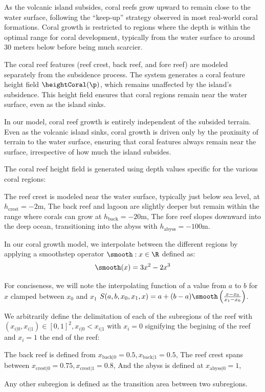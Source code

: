 As the volcanic island subsides, coral reefs grow upward to remain close to the water surface, following the “keep-up” strategy observed in most real-world coral formations. Coral growth is restricted to regions where the depth is within the optimal range for coral development, typically from the water surface to around 30 meters below before being much scarcier.

The coral reef features (reef crest, back reef, and fore reef) are modeled separately from the subsidence process. The system generates a coral feature height field $\heightCoral(\p)$, which remains unaffected by the island's subsidence. This height field ensures that coral regions remain near the water surface, even as the island sinks.

In our model, coral reef growth is entirely independent of the subsided terrain. Even as the volcanic island sinks, coral growth is driven only by the proximity of terrain to the water surface, ensuring that coral features always remain near the surface, irrespective of how much the island subsides.

    The coral reef height field is generated using depth values specific for the various coral regions:
    \begin{Itemize}
        \Item{} The reef crest is modeled near the water surface, typically just below sea level, at $h_\text{crest} = -2$m,
        \Item{} The back reef and lagoon are slightly deeper but remain within the range where corals can grow at $h_\text{back} = -20$m,
        \Item{} The fore reef slopes downward into the deep ocean, transitioning into the abyss with $h_\text{abyss} = -100$m.
    \end{Itemize}

In our coral growth model, we interpolate between the different regions by applying a smoothstep operator $\smooth: x \in \R$ defined as:
\begin{align}
    \smooth(x) = 3x^2 - 2x^3
\end{align}

For conciseness, we will note the interpolating function of a value from $a$ to $b$ for $x$ clamped between $x_0$ and $x_1$ $S(a, b, x_0, x_1, x) = a + (b-a) \smooth\left(\frac{x - x_0}{x_1 - x_0}\right)$.

We arbitrarily define the delimitation of each of the subregions of the reef with $(x_{i|0}, x_{i|1}) \in [0, 1]^2, x_{i|0} < x_{i|1}$ with $x_i = 0$ signifying the begining of the reef and $x_i = 1$ the end of the reef:
\begin{Itemize}
    \Item{} The back reef is defined from $x_{\text{back}|0} = 0.5, x_{\text{back}|1} = 0.5$,
    \Item{} The reef crest spans between $x_{\text{crest}|0} = 0.75, x_{\text{crest}|1} = 0.8$,
    \Item{} And the abyss is defined at $x_{\text{abyss}|0} = 1$,
\end{Itemize}
Any other subregion is defined as the transition area between two subregions.

